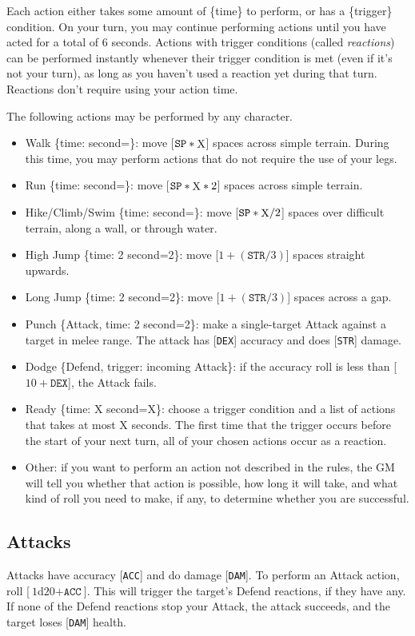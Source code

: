 \documentclass[12pt]{article}
\newcommand{\STR}{\texttt{STR}}
\newcommand{\DEX}{\texttt{DEX}}
\newcommand{\SP}{\texttt{SP}}
\newcommand{\ACC}{\texttt{ACC}}
\newcommand{\DAM}{\texttt{DAM}}
\newcommand{\X}{\text{{\lower 0.2mm \hbox{X}}}}
\newcommand{\TIME}[1]{\{time: #1 second\if1=#1{}\else{s}\fi\}}
\newcommand{\Attack}[1]{\{Attack, time: #1 second\if1=#1{}\else{s}\fi\}}
\newcommand{\Defend}{\{Defend, trigger: incoming Attack\}}
\newcommand{\dice}[2]{\text{#1d#2}}
\begin{document}
Each action either takes some amount of \{time\} to perform, or has a \{trigger\} condition. On your turn, you may continue performing actions until you have acted for a total of 6 seconds. Actions with trigger conditions (called \textit{reactions}) can be performed instantly whenever their trigger condition is met (even if it’s not your turn), as long as you haven't used a reaction yet during that turn. Reactions don’t require using your action time.

The following actions may be performed by any character.
\begin{itemize}
\item Walk \TIME{\X}: move [$\SP * \X$] spaces across simple terrain. During this time, you may perform actions that do not require the use of your legs.
\item Run \TIME{\X}: move [$\SP * \X * 2$] spaces across simple terrain.
\item Hike/Climb/Swim \TIME{\X}: move [$\SP * \X / 2$] spaces over difficult terrain, along a wall, or through water.
\item High Jump \TIME{2}: move [$1 + (\STR / 3)$] spaces straight upwards.
\item Long Jump \TIME{2}: move [$1 + (\STR / 3)$] spaces across a gap.
\item Punch \Attack{2}: make a single-target Attack against a target in melee range. The attack has [\DEX{}] accuracy and does [\STR{}] damage.
\item Dodge \Defend: if the accuracy roll is less than [$10 + \DEX{}$], the Attack fails.
\item Ready \TIME{X}: choose a trigger condition and a list of actions that takes at most X seconds. The first time that the trigger occurs before the start of your next turn, all of your chosen actions occur as a reaction.
\item Other: if you want to perform an action not described in the rules, the GM will tell you whether that action is possible, how long it will take, and what kind of roll you need to make, if any, to determine whether you are successful.
\end{itemize}

\subsection{Attacks}

Attacks have accuracy [\ACC] and do damage [\DAM]. To perform an Attack action, roll [$\dice{1}{20} + \ACC$]. This will trigger the target’s Defend reactions, if they have any. If none of the Defend reactions stop your Attack, the attack succeeds, and the target loses [\DAM] health.
\end{document}
